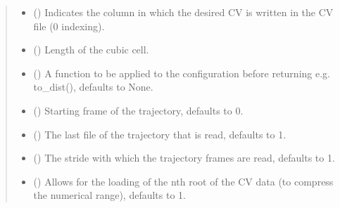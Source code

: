 \documentclass[a4paper,10pt,english]{report}
\begin{document}
\begin{fulllineitems}
\begin{quote}
\begin{description}
\begin{itemize}
\item {} 
\sphinxAtStartPar
{} () \textendash{} Indicates the column in which the desired CV is written in the CV file (0 indexing).

\item {} 
\sphinxAtStartPar
{} () \textendash{} Length of the cubic cell.

\item {} 
\sphinxAtStartPar
{} (\sphinxstyleliteralemphasis{\sphinxupquote{, }}) \textendash{} A function to be applied to the configuration before returning e.g. to\_dist(), defaults to None.

\item {} 
\sphinxAtStartPar
{} (\sphinxstyleliteralemphasis{\sphinxupquote{, }}) \textendash{} Starting frame of the trajectory, defaults to 0.

\item {} 
\sphinxAtStartPar
{} (\sphinxstyleliteralemphasis{\sphinxupquote{, }}) \textendash{} The last file of the trajectory that is read, defaults to \sphinxhyphen{}1.

\item {} 
\sphinxAtStartPar
{} (\sphinxstyleliteralemphasis{\sphinxupquote{, }}) \textendash{} The stride with which the trajectory frames are read, defaults to 1.

\item {} 
\sphinxAtStartPar
{} (\sphinxstyleliteralemphasis{\sphinxupquote{, }}) \textendash{} Allows for the loading of the n\sphinxhyphen{}th root of the CV data (to compress the numerical range), defaults to 1.

\end{itemize}

\end{description}\end{quote}

\end{fulllineitems}
\end{document}
